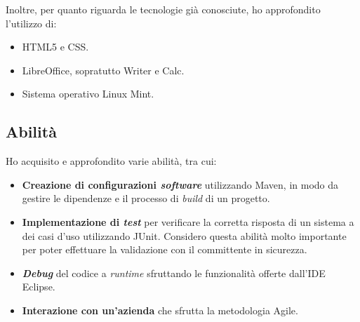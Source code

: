 		Inoltre, per quanto riguarda le tecnologie già conosciute, ho approfondito l'utilizzo di:
		\begin{itemize}
			\item HTML5 e CSS.
			\item LibreOffice, sopratutto Writer e Calc.
			\item Sistema operativo Linux Mint.
		\end{itemize}
	
	\subsection{Abilità}
		Ho acquisito e approfondito varie abilità, tra cui:
			\begin{itemize}
				\item \textbf{Creazione di configurazioni \textit{software}} utilizzando Maven, in modo da gestire le dipendenze e il processo di \textit{build} di un progetto.
				\item \textbf{Implementazione di \textit{test}} per verificare la corretta risposta di un sistema a dei casi d'uso utilizzando JUnit. Considero questa abilità molto importante per poter effettuare la validazione con il committente in sicurezza.
				\item \textbf{\textit{Debug}} del codice a \textit{runtime} sfruttando le funzionalità offerte dall'IDE Eclipse.
				\item \textbf{Interazione con un'azienda} che sfrutta la metodologia Agile.
			\end{itemize}
	
